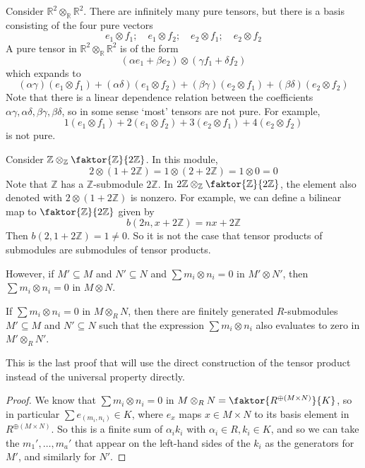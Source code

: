 \begin{example}
    Consider \( \mathbb R^2 \otimes_{\mathbb R} \mathbb R^2 \).
    There are infinitely many pure tensors, but there is a basis consisting of the four pure vectors
    \[ e_1 \otimes f_1;\quad e_1 \otimes f_2;\quad e_2 \otimes f_1;\quad e_2 \otimes f_2 \]
    A pure tensor in \( \mathbb R^2 \otimes_{\mathbb R} \mathbb R^2 \) is of the form
    \[ (\alpha e_1 + \beta e_2) \otimes (\gamma f_1 + \delta f_2) \]
    which expands to
    \[ (\alpha\gamma)(e_1 \otimes f_1) + (\alpha\delta)(e_1 \otimes f_2) + (\beta\gamma)(e_2 \otimes f_1) + (\beta\delta)(e_2 \otimes f_2) \]
    Note that there is a linear dependence relation between the coefficients \( \alpha\gamma, \alpha\delta, \beta\gamma, \beta\delta \), so in some sense `most' tensors are not pure.
    For example,
    \[ 1(e_1 \otimes f_1) + 2(e_1 \otimes f_2) + 3(e_2 \otimes f_1) + 4(e_2 \otimes f_2) \]
    is not pure.
\end{example}
\begin{example}
    Consider \( \mathbb Z \otimes_{\mathbb Z} \faktor{\mathbb Z}{2\mathbb Z} \).
    In this module,
    \[ 2 \otimes (1 + 2\mathbb Z) = 1 \otimes (2 + 2\mathbb Z) = 1 \otimes 0 = 0 \]
    Note that \( \mathbb Z \) has a \( \mathbb Z \)-submodule \( 2\mathbb Z \).
    In \( 2\mathbb Z \otimes_{\mathbb Z} \faktor{\mathbb Z}{2\mathbb Z} \), the element also denoted with \( 2 \otimes (1 + 2\mathbb Z) \) is nonzero.
    For example, we can define a bilinear map to \( \faktor{\mathbb Z}{2\mathbb Z} \) given by
    \[ b(2n, x + 2\mathbb Z) = n x + 2\mathbb Z \]
    Then \( b(2, 1 + 2\mathbb Z) = 1 \neq 0 \).
    So it is not the case that tensor products of submodules are submodules of tensor products.

    However, if \( M' \subseteq M \) and \( N' \subseteq N \) and \( \sum m_i \otimes n_i = 0 \) in \( M' \otimes N' \), then \( \sum m_i \otimes n_i = 0 \) in \( M \otimes N \).
\end{example}
\begin{proposition}
    If \( \sum m_i \otimes n_i = 0 \) in \( M \otimes_R N \), then there are finitely generated \( R \)-submodules \( M' \subseteq M \) and \( N' \subseteq N \) such that the expression \( \sum m_i \otimes n_i \) also evaluates to zero in \( M' \otimes_R N' \).
\end{proposition}
This is the last proof that will use the direct construction of the tensor product instead of the universal property directly.
\begin{proof}
    We know that \( \sum m_i \otimes n_i = 0 \) in \( M \otimes_R N = \faktor{R^{\oplus(M \times N)}}{K} \), so in particular \( \sum e_{(m_i, n_i)} \in K \), where \( e_x \) maps \( x \in M \times N \) to its basis element in \( R^{\oplus(M \times N)} \).
    So this is a finite sum of \( \alpha_i k_i \) with \( \alpha_i \in R, k_i \in K \), and so we can take the \( m_1', \dots, m_a' \) that appear on the left-hand sides of the \( k_i \) as the generators for \( M' \), and similarly for \( N' \).
\end{proof}
